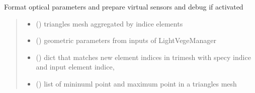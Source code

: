 \documentclass[letterpaper,10pt,english]{sphinxmanual}
\begin{document}
\begin{fulllineitems}
\label{\detokenize{reference:CARIBUinputs.Prepare_CARIBU}}
\pysigstartsignatures
{}
\pysigstopsignatures
\sphinxAtStartPar
Format optical parameters and prepare virtual sensors and debug if activated
\begin{quote}\begin{description}
\begin{itemize}
\item {} 
\sphinxAtStartPar
{} () \textendash{} 
\sphinxAtStartPar
triangles mesh aggregated by indice elements

\begin{sphinxVerbatim}[commandchars=\\\{\}]
   \PYG{p}{[}  \PYG{p}{]}
\end{sphinxVerbatim}


\item {} 
\sphinxAtStartPar
{} () \textendash{} geometric parameters from inputs of LightVegeManager

\item {} 
\sphinxAtStartPar
{} () \textendash{} 
\sphinxAtStartPar
dict that matches new element indices in trimesh with specy indice and
input element indice,

\begin{sphinxVerbatim}[commandchars=\\\{\}]
      
\end{sphinxVerbatim}


\item {} 
\sphinxAtStartPar
{} (\sphinxstyleliteralemphasis{\sphinxupquote{{[}}}\sphinxstyleliteralemphasis{\sphinxupquote{, }}\sphinxstyleliteralemphasis{\sphinxupquote{{]}}}) \textendash{} list of mininuml point and maximum point in a triangles mesh


\end{itemize}
\end{description}
\end{quote}
\end{fulllineitems}
\end{document}

